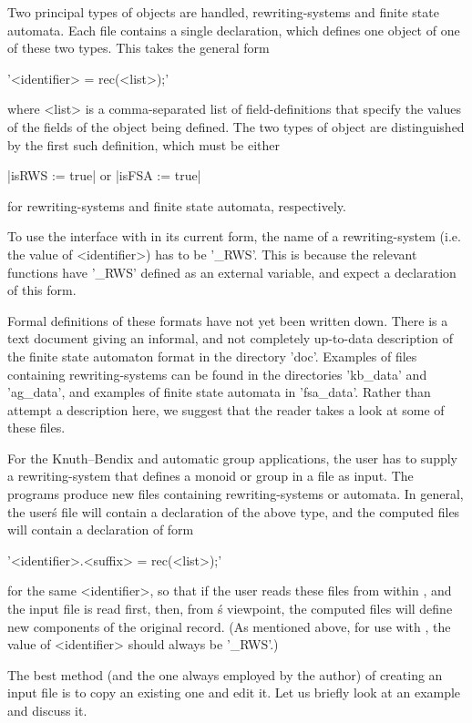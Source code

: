 Two principal types of objects are handled, rewriting-systems and
finite state automata. Each file contains a single {\GAP} declaration, which
defines one object of one of these two types. This takes the general form

'<identifier> \:= rec(<list>);'

where <list> is a comma-separated list
of field-definitions that specify the values of the fields of the object
being defined. The two types of object are distinguished by the first
such definition, which must be either

|isRWS := true| \hspace{1cm}  or \hspace{1cm}  |isFSA := true|

for rewriting-systems and finite state automata, respectively.

To use the interface with {\GAP} in its current form, the name of a
rewriting-system (i.e. the value of <identifier>) has to be '\_RWS'.
This is because the relevant {\GAP} functions have '\_RWS' defined as an
external variable, and expect a declaration of this form.

Formal definitions of these formats have not yet been written down.
There is a text document giving an informal, and not completely up-to-data
description of the finite state automaton format in the {\KBMAG}
directory 'doc'. Examples of files containing rewriting-systems can be
found in the directories 'kb\_data' and 'ag\_data', and examples of
finite state automata in 'fsa\_data'. Rather than attempt a description
here, we suggest that the reader takes a look at some of these files.

For the Knuth--Bendix and automatic group applications, the user has to
supply a rewriting-system that defines a monoid or group in a file as input.
The programs produce new files containing rewriting-systems or automata.
In general, the user\'s file will contain a declaration of the above type,
and the computed files will contain a declaration of form

'<identifier>.<suffix> \:= rec(<list>);'

for the same <identifier>, so that if the user reads these files from
within {\GAP}, and the input file is read first, then, from {\GAP}\'s
viewpoint, the computed files will define new components of the original
record. (As mentioned above, for use with {\GAP}, the value of
<identifier> should always be '\_RWS'.)

The best method (and the one always employed by the author)
of creating an input file is to copy an existing one and edit it. Let us
briefly look at an example and discuss it.

